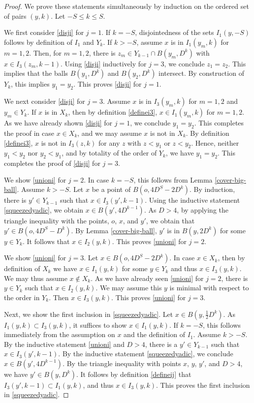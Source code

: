 \begin{proof}
We prove these statements simultaneously by induction on the ordered set of pairs $(y,k)$. Let $-S\le k\le S$.

We first consider \eqref{disji} for $j=1$. If $k=-S$, disjointedness of the sets $I_1(y,-S)$ follows by definition of $I_1$ and $Y_k$. If $k>-S$, assume $x$ is in $I_1(y_m,k)$ for $m=1,2$. Then, for $m=1,2$, there is $z_m\in Y_{k-1}\cap B(y_m,D^k)$ with $x\in I_3(z_m,k-1)$. Using \eqref{disji} inductively for $j=3$, we conclude $z_1=z_2$. This implies that the balls $B(y_1, D^k)$ and $B(y_2, D^k)$ intersect. By construction of $Y_k$, this implies $y_1=y_2$. This proves \eqref{disji} for $j=1$.

We next consider \eqref{disji} for $j=3$. Assume $x$ is in $I_3(y_m,k)$ for $m=1,2$ and $y_m\in Y_k$. If $x$ is in $X_k$, then by definition \eqref{definei3}, $x\in I_1(y_m,k)$ for $m=1,2$. As we have already shown \eqref{disji} for $j=1$, we conclude $y_1=y_2$. This completes the proof in case $x\in X_k$, and we may assume $x$ is not in $X_k$. By definition \eqref{definei3}, $x$ is not in $I_3(z,k)$ for any $z$ with $z<y_1$ or $z<y_2$. Hence, neither $y_1<y_2$ nor $y_2<y_1$, and by totality of the order of $Y_k$, we have $y_1=y_2$. This completes the proof of \eqref{disji} for $j=3$.

We show \eqref{unioni} for $j=2$. In case $k=-S$, this follows from Lemma \ref{cover-big-ball}. Assume $k>-S$. Let $x$ be a point of $B(o, 4D^S-2D^k)$. By induction, there is $y'\in Y_{k-1}$ such that $x\in I_3(y',k-1)$. Using the inductive statement \eqref{squeezedyadic}, we obtain $x\in B(y',4D^{k-1})$. As $D>4$, by applying the triangle inequality with the points, $o$, $x$, and $y'$, we obtain that $y'\in B(o, 4D^S-D^k)$. By Lemma \ref{cover-big-ball}, $y'$ is in $B(y,2D^k)$ for some $y\in Y_k$. It follows that $x\in I_2(y,k)$. This proves \eqref{unioni} for $j=2$.

We show \eqref{unioni} for $j=3$. Let $x\in B(o, 4D^S-2D^k)$. In case $x\in X_k$, then by definition of $X_k$ we have $x\in I_1(y,k)$ for some $y\in Y_k$ and thus $x\in I_3(y,k)$. We may thus assume $x\not\in X_k$. As we have already seen \eqref{unioni} for $j=2$, there is $y\in Y_k$ such that $x\in I_2(y,k)$. We may assume this $y$ is minimal with respect to the order in $Y_k$. Then $x\in I_3(y,k)$. This proves \eqref{unioni} for $j=3$.

Next, we show the first inclusion in \eqref{squeezedyadic}. Let $x\in B(y,\frac 12 D^k)$. As $I_1(y,k)\subset I_3(y,k)$, it suffices to show $x\in I_1(y,k)$. If $k=-S$, this follows immediately from the assumption on $x$ and the definition of $I_1$. Assume $k>-S$. By the inductive statement \eqref{unioni} and $D>4$, there is a $y'\in Y_{k-1}$ such that $x\in I_3(y',k-1)$. By the inductive statement \eqref{squeezedyadic}, we conclude $x\in B(y',4D^{k-1})$. By the triangle inequality with points $x$, $y$, $y'$, and $D>4$, we have $y'\in B(y,D^k)$. It follows by definition \eqref{defineij} that $I_3(y',k-1)\subset I_1(y,k)$, and thus $x\in I_3(y,k)$. This proves the first inclusion in \eqref{squeezedyadic}.


\end{proof}
